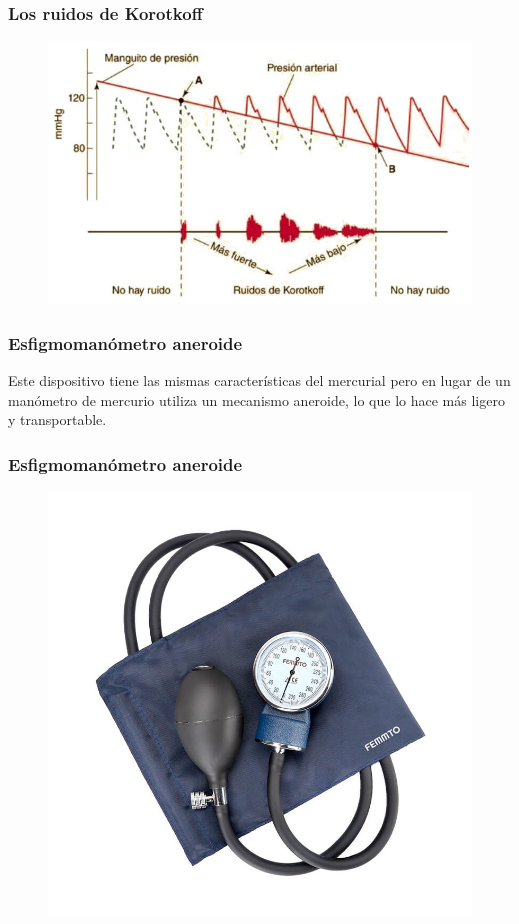 \documentclass[14pt]{beamer}
\begin{document}
\begin{frame}
\frametitle{Los ruidos de Korotkoff}
\vspace*{-1cm}
\begin{figure}
    \centering
    \includegraphics[scale=0.6]{Imagenes/Esfigmomanometro_06.jpg}
\end{figure}
\end{frame}     
\begin{frame}
\frametitle{Esfigmomanómetro aneroide}
Este dispositivo tiene las mismas características del mercurial pero en lugar de un manómetro de mercurio utiliza un mecanismo aneroide, lo que lo hace más ligero y transportable.
\end{frame}
\begin{frame}
\frametitle{Esfigmomanómetro aneroide}
\vspace*{-1cm}
\begin{figure}
    \centering
    \includegraphics[scale=0.25]{Imagenes/Esfigmomanometro_07.jpg}
\end{figure}
\end{frame}
\end{document}
